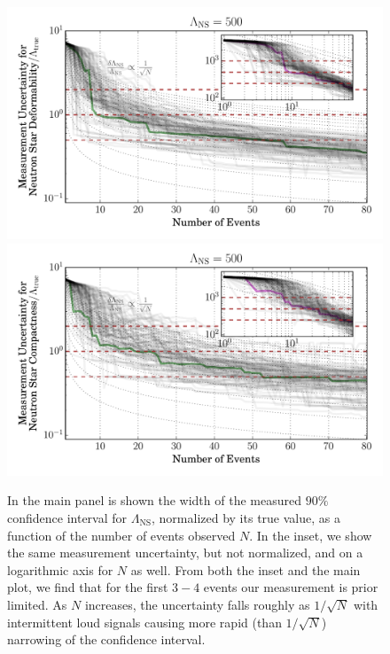 \documentclass[aps,prd,amsmath,floats,floatfix, twocolumn,
superscriptaddress,nofootinbib,showpacs]{revtex4-1}
\newcommand{\lambdans}{\Lambda_\mathrm{NS}}
\begin{document}
\begin{figure}
\includegraphics[width=0.85\columnwidth]{plots/LambdaCIWidths_vs_N_AllPopulations_Log_L500.pdf}
\includegraphics[width=0.85\columnwidth]{plots/LambdaCIWidths_vs_N_AstroPopulations_Log_L500.pdf}
\caption{ In the main panel is shown the width of the measured $90\%$ 
confidence interval for $\lambdans$, normalized by its true value,
 as a function of the number of events observed $N$. In the inset, we
 show the same measurement uncertainty, but not normalized, and on a 
 logarithmic axis for $N$ as well.
% 
 From both the inset and the main plot, we find that for the first $3-4$ events
 our measurement is prior limited. As $N$ increases, the uncertainty falls 
 roughly as $1/\sqrt{N}$ with intermittent loud signals causing more rapid 
 (than $1/\sqrt{N}$) narrowing of the confidence interval.
}
\label{fig:TT_LambdaError_vs_N_L500_2000_CI90_0}
\end{figure}
% 
\end{document}
